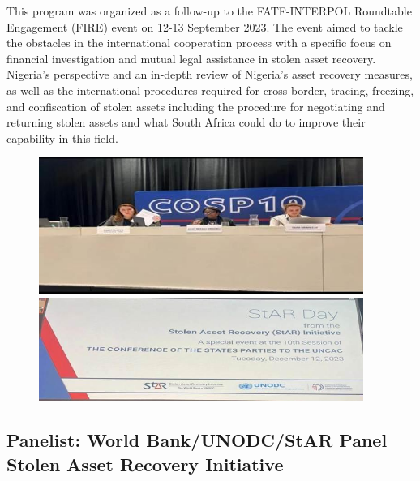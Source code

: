 \documentclass[
  letterpaper,
  DIV=11,
  numbers=noendperiod]{scrreprt}
\begin{document}
This program was organized as a follow-up to the FATF-INTERPOL
Roundtable Engagement (FIRE) event on 12-13 September 2023. The event
aimed to tackle the obstacles in the international cooperation process
with a specific focus on financial investigation and mutual legal
assistance in stolen asset recovery.\\
Nigeria's perspective and an in-depth review of Nigeria's asset recovery
measures, as well as the international procedures required for
cross-border, tracing, freezing, and confiscation of stolen assets
including the procedure for negotiating and returning stolen assets and
what South Africa could do to improve their capability in this field.

\begin{figure}

\begin{minipage}{0.50\linewidth}
\begin{center}
\includegraphics[width=4.16667in,height=\textheight,keepaspectratio]{images/return/03_1_star.jpg}
\end{center}
\end{minipage}%
%
\begin{minipage}{0.50\linewidth}
\begin{center}
\includegraphics[width=4.16667in,height=\textheight,keepaspectratio]{images/return/03_star.jpg}
\end{center}
\end{minipage}%

\end{figure}%

\subsection{Panelist: World Bank/UNODC/StAR Panel Stolen Asset Recovery
Initiative}\label{panelist-world-bankunodcstar-panel-stolen-asset-recovery-initiative}
\end{document}
